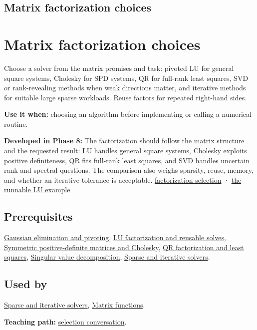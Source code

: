 \hypertarget{appendix-221a483bec2d}{}
\section*{Matrix factorization choices}
\chapter{Matrix factorization choices}\label{appendix-221a483bec2d-matrix-factorization-choices}

Choose a solver from the matrix promises and task: pivoted LU for general square systems, Cholesky for SPD systems, QR for full-rank least squares, SVD or rank-revealing methods when weak directions matter, and iterative methods for suitable large sparse workloads. Reuse factors for repeated right-hand sides.

\textbf{Use it when:} choosing an algorithm before implementing or calling a numerical routine.

\textbf{Developed in Phase 8:} The factorization should follow the matrix structure and the requested result: LU handles general square systems, Cholesky exploits positive definiteness, QR fits full-rank least squares, and SVD handles uncertain rank and spectral questions. The comparison also weighs sparsity, reuse, memory, and whether an iterative tolerance is acceptable. \href{Continuous\%20Notes/Computing\%20Foundations\%20-\%20From\%20Bits\%20to\%20C++\%20and\%20Systems\%20APIs\#Choose\%20a\%20factorization\%20from\%20structure\%20and\%20the\%20requested\%20answer}{factorization selection} · \href{Continuous\%20Notes/Computing\%20Foundations\%20-\%20From\%20Bits\%20to\%20C++\%20and\%20Systems\%20APIs\#A\%20runnable\%20pivoted\%20LU\%20reference\%20preserves\%20the\%20elimination\%20history}{the runnable LU example}

\section{Prerequisites}\label{appendix-221a483bec2d-prerequisites}

\hyperref[appendix-f6e77f4a200f]{Gaussian elimination and pivoting}, \hyperref[appendix-55e4b5b0a1e6]{LU factorization and reusable solves}, \hyperref[appendix-50d2ea3c9b26]{Symmetric positive-definite matrices and Cholesky}, \hyperref[appendix-c3421e6b4f2c]{QR factorization and least squares}, \hyperref[appendix-1fad5e7f36fa]{Singular value decomposition}, \hyperref[appendix-67c87a3d9e94]{Sparse and iterative solvers}.

\section{Used by}\label{appendix-221a483bec2d-used-by}

\hyperref[appendix-67c87a3d9e94]{Sparse and iterative solvers}, \hyperref[appendix-0f4bc2bf2b1f]{Matrix functions}.

\textbf{Teaching path:} \href{Continuous\%20Notes/Computing\%20Foundations\%20-\%20From\%20Bits\%20to\%20C++\%20and\%20Systems\%20APIs\#Close\%20the\%20journey\%20with\%20an\%20algorithm-selection\%20conversation}{selection conversation}.
